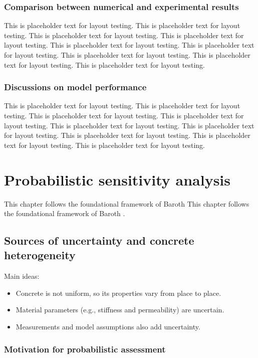 \documentclass[a4paper,12pt,twoside]{report}     %
\begin{document}
\subsection{Comparison between numerical and experimental results}
This is placeholder text for layout testing. This is placeholder text for layout testing. This is placeholder text for layout testing. This is placeholder text for layout testing. This is placeholder text for layout testing. This is placeholder text for layout testing. This is placeholder text for layout testing. This is placeholder text for layout testing. This is placeholder text for layout testing.
\subsection{Discussions on model performance}
This is placeholder text for layout testing. This is placeholder text for layout testing. This is placeholder text for layout testing. This is placeholder text for layout testing. This is placeholder text for layout testing. This is placeholder text for layout testing. This is placeholder text for layout testing. This is placeholder text for layout testing. This is placeholder text for layout testing.




\cleardoublepage
\chapter{Probabilistic sensitivity analysis}
This chapter follows the foundational framework of Baroth This chapter follows the foundational framework of Baroth \cite{baroth_introduction_2011}.

\section{Sources of uncertainty and concrete heterogeneity}
Main ideas:
\begin{itemize}
  \item Concrete is not uniform, so its properties vary from place to place.
  \item Material parameters (e.g., stiffness and permeability) are uncertain.
  \item Measurements and model assumptions also add uncertainty.
\end{itemize}

\subsection{Motivation for probabilistic assessment}
\end{document}
